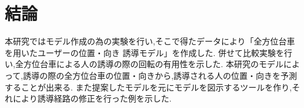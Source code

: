 \chapter{結論}
本研究ではモデル作成の為の実験を行い,そこで得たデータにより「全方位台車を用いたユーザーの位置・向き 誘導モデル」を作成した.
併せて比較実験を行い,全方位台車による人の誘導の際の回転の有用性を示した.
本研究のモデルによって,誘導の際の全方位台車の位置・向きから,誘導される人の位置・向きを予測することが出来る.
また提案したモデルを元にモデルを図示するツールを作り,それにより誘導経路の修正を行った例を示した.
